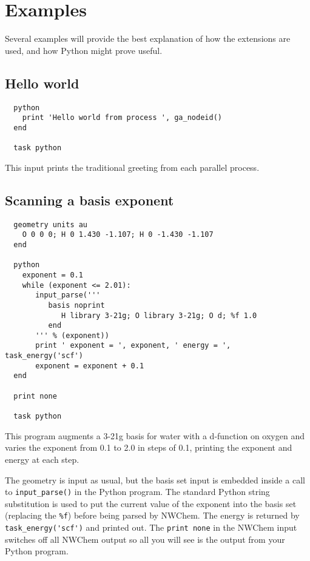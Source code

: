 \section{Examples}

Several examples will provide the best explanation of how the extensions
are used, and how Python might prove useful.

\subsection{Hello world}

\begin{verbatim}
  python
    print 'Hello world from process ', ga_nodeid()
  end

  task python
\end{verbatim}

This input prints the traditional greeting from each parallel process.

\subsection{Scanning a basis exponent}
\begin{verbatim}
  geometry units au
    O 0 0 0; H 0 1.430 -1.107; H 0 -1.430 -1.107
  end

  python
    exponent = 0.1
    while (exponent <= 2.01):
       input_parse('''
          basis noprint
             H library 3-21g; O library 3-21g; O d; %f 1.0
          end
       ''' % (exponent))
       print ' exponent = ', exponent, ' energy = ', task_energy('scf')
       exponent = exponent + 0.1
  end

  print none

  task python
\end{verbatim}

This program augments a 3-21g basis for water with a d-function on
oxygen and varies the exponent from 0.1 to 2.0 in steps of 0.1,
printing the exponent and energy at each step.  

The geometry is input as usual, but the basis set input is embedded
inside a call to \verb+input_parse()+ in the Python program.  The
standard Python string substitution is used to put the current value of
the exponent into the basis set (replacing the \verb+%f+) before being
parsed by NWChem.  The energy is returned by \verb+task_energy('scf')+
and printed out.  The \verb+print none+ in the NWChem input switches
off all NWChem output so all you will see is the output from your
Python program.

